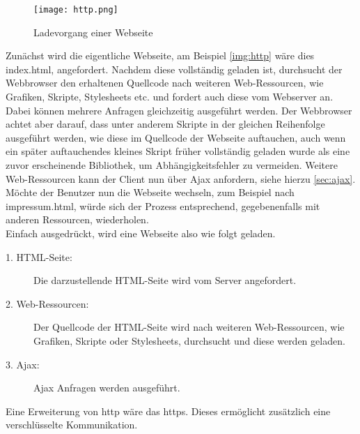 \begin{figure}[H]
	\begin{center}
		\texttt{[image: http.png]}
		\caption{Ladevorgang einer Webseite}
		\label{img:http}
	\end{center}
\end{figure}

Zunächst wird die eigentliche Webseite, am Beispiel \autoref{img:http} wäre dies index.html, angefordert. Nachdem diese vollständig geladen ist, durchsucht der Webbrowser den erhaltenen Quellcode nach weiteren Web-Ressourcen, wie Grafiken, Skripte, Stylesheets etc. und fordert auch diese vom Webserver an. Dabei können mehrere Anfragen gleichzeitig ausgeführt werden. Der Webbrowser achtet aber darauf, dass unter anderem Skripte in der gleichen Reihenfolge ausgeführt werden, wie diese im Quellcode der Webseite auftauchen, auch wenn ein später auftauchendes kleines Skript früher vollständig geladen wurde als eine zuvor erscheinende Bibliothek, um Abhängigkeitsfehler zu vermeiden. Weitere Web-Ressourcen kann der Client nun über Ajax anfordern, siehe hierzu \autoref{sec:ajax}. \\
Möchte der Benutzer nun die Webseite wechseln, zum Beispiel nach impressum.html, würde sich der Prozess entsprechend, gegebenenfalls mit anderen Ressourcen, wiederholen. \\

Einfach ausgedrückt, wird eine Webseite also wie folgt geladen.

\begin{description}
	\item[1. HTML-Seite:] Die darzustellende HTML-Seite wird vom Server angefordert.
	\item[2. Web-Ressourcen:] Der Quellcode der HTML-Seite wird nach weiteren Web-Ressourcen, wie Grafiken, Skripte oder Stylesheets, durchsucht und diese werden geladen.
	\item[3. Ajax:] Ajax Anfragen werden ausgeführt.
\end{description}

Eine Erweiterung von \ac{http} wäre das \ac{https}. Dieses ermöglicht zusätzlich eine verschlüsselte Kommunikation.